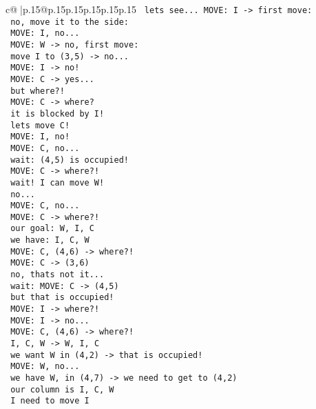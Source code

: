 \documentclass{article}
\begin{document}
{\begin{supertabular}{c@{$\;$}|p{.15\linewidth}@{}p{.15\linewidth}p{.15\linewidth}p{.15\linewidth}p{.15\linewidth}p{.15\linewidth}}
{{{\texttt{ lets see... MOVE: I {-}> first move: } \\
\texttt{ no, move it to the side: } \\
\texttt{ MOVE: I, no...} \\
\texttt{ MOVE: W {-}> no, first move: } \\
\texttt{ move I to (3,5) {-}> no...} \\
\texttt{ MOVE: I {-}> no!} \\
\texttt{ MOVE: C {-}> yes...} \\
\texttt{ but where?!} \\
\texttt{ MOVE: C {-}> where? } \\
\texttt{ it is blocked by I!} \\
\texttt{ lets move C!} \\
\texttt{ MOVE: I, no!} \\
\texttt{ MOVE: C, no... } \\
\texttt{ wait: (4,5) is occupied!} \\
\texttt{ MOVE: C {-}> where?!} \\
\texttt{ wait! I can move W!} \\
\texttt{ no...} \\
\texttt{ MOVE: C, no...} \\
\texttt{ MOVE: C {-}> where?!} \\
\texttt{ our goal: W, I, C } \\
\texttt{ we have: I, C, W } \\
\texttt{ MOVE: C, (4,6) {-}> where?!} \\
\texttt{ MOVE: C {-}> (3,6) } \\
\texttt{ no, thats not it...} \\
\texttt{ wait: MOVE: C {-}> (4,5) } \\
\texttt{ but that is occupied!} \\
\texttt{ MOVE: I {-}> where?!} \\
\texttt{ MOVE: I {-}> no...} \\
\texttt{ MOVE: C, (4,6) {-}> where?!} \\
\texttt{ I, C, W {-}> W, I, C} \\
\texttt{ we want W in (4,2) {-}> that is occupied!} \\
\texttt{ MOVE: W, no...} \\
\texttt{ we have W, in (4,7) {-}> we need to get to (4,2) } \\
\texttt{ our column is I, C, W } \\
\texttt{ I need to move I } \\
}}}
\end{supertabular}}
\end{document}
